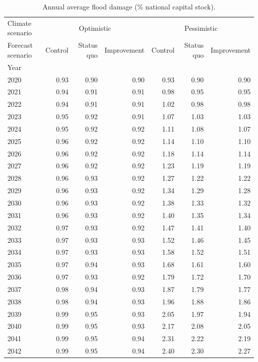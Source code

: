 \begin{table}
\caption{Annual average flood damage (\% national capital stock).}
\label{tab:drr_impact_channel_KHM}
\centering
\begin{tabular}{lrrrrrr}
\toprule
Climate scenario & \multicolumn{3}{c}{Optimistic} & \multicolumn{3}{c}{Pessimistic} \\
Forecast scenario & Control & Status quo & Improvement & Control & Status quo & Improvement \\
Year &  &  &  &  &  &  \\
\midrule
2020 & 0.93 & 0.90 & 0.90 & 0.93 & 0.90 & 0.90 \\
2021 & 0.94 & 0.91 & 0.91 & 0.98 & 0.95 & 0.95 \\
2022 & 0.94 & 0.91 & 0.91 & 1.02 & 0.98 & 0.98 \\
2023 & 0.95 & 0.92 & 0.91 & 1.07 & 1.03 & 1.03 \\
2024 & 0.95 & 0.92 & 0.92 & 1.11 & 1.08 & 1.07 \\
2025 & 0.96 & 0.92 & 0.92 & 1.14 & 1.10 & 1.10 \\
2026 & 0.96 & 0.92 & 0.92 & 1.18 & 1.14 & 1.14 \\
2027 & 0.96 & 0.92 & 0.92 & 1.23 & 1.19 & 1.19 \\
2028 & 0.96 & 0.93 & 0.92 & 1.27 & 1.22 & 1.22 \\
2029 & 0.96 & 0.93 & 0.92 & 1.34 & 1.29 & 1.28 \\
2030 & 0.96 & 0.93 & 0.92 & 1.38 & 1.33 & 1.32 \\
2031 & 0.96 & 0.93 & 0.92 & 1.40 & 1.35 & 1.34 \\
2032 & 0.97 & 0.93 & 0.92 & 1.47 & 1.41 & 1.40 \\
2033 & 0.97 & 0.93 & 0.93 & 1.52 & 1.46 & 1.45 \\
2034 & 0.97 & 0.93 & 0.93 & 1.58 & 1.52 & 1.51 \\
2035 & 0.97 & 0.94 & 0.93 & 1.68 & 1.61 & 1.60 \\
2036 & 0.97 & 0.93 & 0.92 & 1.79 & 1.72 & 1.70 \\
2037 & 0.98 & 0.94 & 0.93 & 1.87 & 1.79 & 1.77 \\
2038 & 0.98 & 0.94 & 0.93 & 1.96 & 1.88 & 1.86 \\
2039 & 0.99 & 0.95 & 0.93 & 2.05 & 1.97 & 1.94 \\
2040 & 0.99 & 0.95 & 0.93 & 2.17 & 2.08 & 2.05 \\
2041 & 0.99 & 0.95 & 0.94 & 2.31 & 2.22 & 2.19 \\
2042 & 0.99 & 0.95 & 0.94 & 2.40 & 2.30 & 2.27 \\

\end{tabular}
\end{table}
